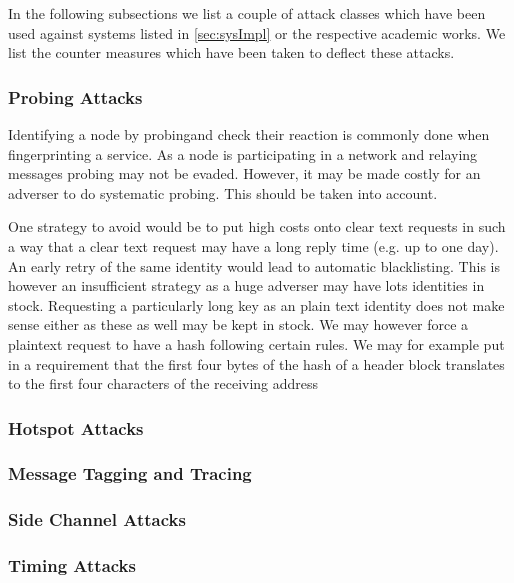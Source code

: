 In the following subsections we list a couple of attack classes which have been used against systems listed in \ref{sec:sysImpl} or the respective academic works. We list the counter measures which have been taken to deflect these attacks.

\subsubsection{Probing Attacks}
Identifying a node by probingand check their reaction is commonly done when fingerprinting a service. As a node is participating in a network and relaying messages probing may not be evaded. However, it may be made costly for an adverser to do systematic probing. This should be taken into account. 

One strategy to avoid would be to put high costs onto clear text requests in such a way that a clear text request may have a long reply time (e.g. up to one day). An early retry of the same identity would lead to automatic blacklisting. This is however an insufficient strategy as a huge adverser may have lots identities in stock. Requesting a particularly long key as an plain text identity does not make sense either as these as well may be kept in stock. We may however force a plaintext request to have a hash following certain rules. We may for example put in a requirement that the first four bytes of the hash of a header block translates to the first four characters of the receiving address



\subsubsection{Hotspot Attacks}

\subsubsection{Message Tagging and Tracing}

\subsubsection{Side Channel Attacks}

\subsubsection{Timing Attacks}

